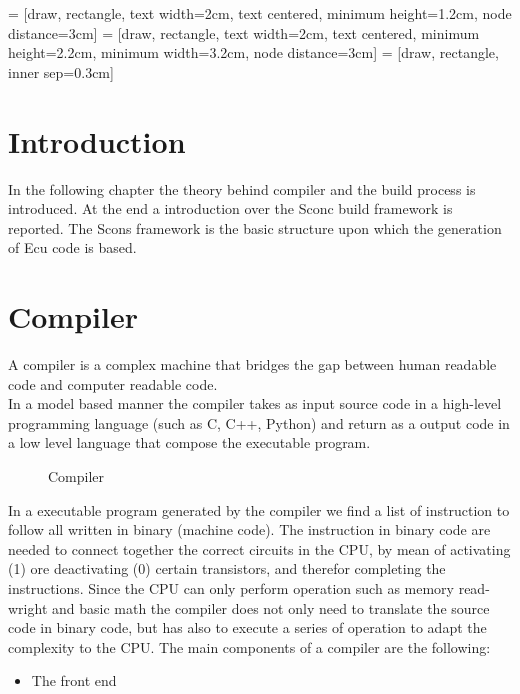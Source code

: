 \documentclass[../main.tex]{subfiles}
\begin{document}
 = [draw, rectangle, text width=2cm, text centered, minimum height=1.2cm, node distance=3cm]
 = [draw, rectangle, text width=2cm, text centered, minimum height=2.2cm, minimum width=3.2cm, node distance=3cm]
 = [draw, rectangle, inner sep=0.3cm]


\section{Introduction}
In the following chapter the theory behind compiler and the build process is introduced. At the end a introduction over the Sconc build framework is reported. The Scons framework is the basic structure upon which the generation of Ecu code is based. 

\section{Compiler}
A compiler is a complex machine that bridges the gap between human readable code and computer readable code.\\
In a model based manner the compiler takes as input source code in a high-level programming language (such as C, C++, Python) and return as a output code in a low level language that compose the executable program. 
\begin{figure}[H]
  \centering
{}
    \caption{Compiler}
    \label{fig:compiler}
\end{figure}
In a executable program generated by the compiler we find a list of instruction to follow all written in binary (machine code). The instruction in binary code are needed to connect together the correct circuits in the CPU, by mean of activating (1) ore deactivating (0) certain transistors, and therefor completing the instructions. Since the CPU can only perform operation such as memory read-wright and basic math the compiler does not only need to translate the source code in binary code, but has also to execute a series of operation to adapt the complexity to the CPU. 
The main components of a compiler are the following:
\begin{itemize}
    \item The front end
\end{itemize}
\end{document}
